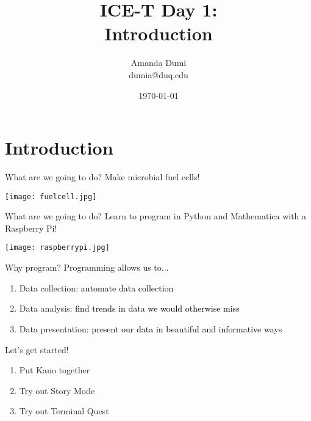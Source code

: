 \documentclass[xcolor=x11names,compress]{beamer}
\title[{\makebox[.5\paperwidth]{General Chemistry Recitation 1\hfill
       \insertframenumber/\inserttotalframenumber}}]{ICE-T Day 1:\\
Introduction}
\author[\quad Amanda \quad\quad\quad\quad aed63@pitt.edu]{Amanda Dumi\\
dumia@duq.edu
}
\date{\small{\today}}
\renewcommand{\(}{\begin{columns}}
\renewcommand{\)}{\end{columns}}
\newcommand{\<}[1]{\begin{column}{#1}}
\renewcommand{\>}{\end{column}}
\begin{document}
\section{Introduction}
\begin{frame}
\titlepage
\end{frame}
\begin{frame}{What are we going to do?}
    Make microbial fuel cells!
    \begin{center}
        \texttt{[image: fuelcell.jpg]}
    \end{center}
\end{frame}
\begin{frame}{What are we going to do?}
    Learn to program in Python and Mathematica with a Raspberry Pi!
    \begin{center}
        \texttt{[image: raspberrypi.jpg]}
    \end{center}
\end{frame}
    \begin{frame}{Why program?}
Programming allows us to...
\begin{enumerate}[label=$\bullet$]
\item \textcolor{darkcoral}{Data collection: } \textcolor{black}{automate data collection}  \vspace{0.5cm} \pause
\item \textcolor{darkcoral}{Data analysis:} \textcolor{black}{find trends in data we would otherwise miss} \vspace{0.5cm} \pause
\item \textcolor{darkcoral}{Data presentation:} \textcolor{black}{present our data in beautiful and informative ways}
\end{enumerate}
\end{frame}

\begin{frame}{Let's get started!}
    \begin{enumerate}[label=$\bullet$]
        \item \textcolor{darkcoral}{Put Kano together} \vspace{0.5cm} 
        \item \textcolor{darkcoral}{Try out Story Mode} \vspace{0.5cm} 
        \item \textcolor{darkcoral}{Try out Terminal Quest}
    \end{enumerate}
\end{frame}
\end{document}
